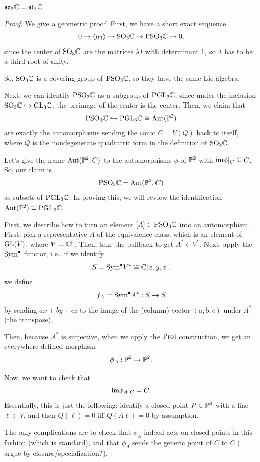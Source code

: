 \documentclass[12pt]{article}
\newcommand{\so}{\mathfrak{so}}
\newcommand{\SO}{\mathrm{SO}}
\newcommand{\fsl}{\operatorname{\mathfrak{sl}}}
\begin{document}
\begin{prop}
    $\so_3 \C = \fsl_2 \C$
\end{prop}
\begin{proof}
    We give a geometric proof. First, we have a short exact sequence
    \[0\to \<\mu_3\> \to \SO_3 \C \to \mathrm{PSO}_3 \C \to 0,\]
    since the center of $\SO_3 \C$ are the matrices $\lambda I$ with determinant $1$, so $\lambda$ has to be a third root of unity.

    So, $\SO_3 \C$ is a covering group of $\mathrm{PSO}_3 \C$, so they have the same Lie algebra.

    Next, we can identify $\mathrm{PSO}_3 \C$ as a subgroup of $\mathrm{PGL}_3 \C$, since under the inclusion $\SO_3 \C\hookrightarrow \GL_3 \C$, the preimage of the center is the center. Then, we claim that 
    \[\mathrm{PSO}_3 \C \hookrightarrow \mathrm{PGL}_3 \C \cong \Aut(\P^2)\]
    are exactly the automorphisms sending the conic $C=V(Q)$ back to itself, where $Q$ is the nondegenerate quadratric form in the definition of $\SO_3 \C$.

    Let's give the name $\Aut(\P^2,C)$ to the automorphisms $\phi$ of $\P^2$ with $\im \phi|_C \subseteq C$. So, our claim is
    \[\mathrm{PSO}_3 \C = \Aut(\P^2,C)\]
    as subsets of $\mathrm{PGL}_3 \C$. In proving this, we will review the identification $\Aut(\P^2) \cong \mathrm{PGL}_3 \C$.
    
    First, we describe how to turn an element $[A]\in \mathrm{PSO}_3 \C$ into an automorphism. First, pick a representative $A$ of the equivalence class, which is an element of $\GL(V)$, where $V=\C^3$. Then, take the pullback to get $A^* \in V^*$. Next, apply the $\Sym^\bullet$ functor, i.e., if we identify
    \[S = \Sym^\bullet V^* \cong \C[x,y,z],\]
    we define
    \[f_A = \Sym^\bullet A^*: S\to S\]
    by sending $ax+by+cz$ to the image of the (column) vector $(a,b,c)$ under $A^*$ (the transpose).

    Then, because $A^*$ is surjective, when we apply the $\Proj$ construction, we get an everywhere-defined morphism
    \[\phi_A: \P^2 \to \P^2.\]
    
    Now, we want to check that
    \[\im \phi_A|_C = C.\]
    Essentially, this is just the following: identify a closed point $P\in \P^2$ with a line $\ell\in V$, and then $Q(\ell)=0$ iff $Q(A\ell)=0$ by assumption.

    The only complications are to check that $\phi_A$ indeed acts on closed points in this fashion (which is standard), and that $\phi_A$ sends the generic point of $C$ to $C$ ({\color{red} argue by closure/specialization?}).


\end{proof}
\end{document}

